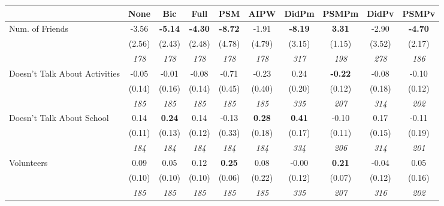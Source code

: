 \begin{tabular}{l c c c c c c c c c}
\toprule
 & None & Bic & Full & PSM & AIPW & DidPm & PSMPm & DidPv & PSMPv \\
\midrule
Num. of Friends & -3.56 & \textbf{ -5.14 } & \textbf{ -4.30 } & \textbf{-8.72} & -1.91 & \textbf{ -8.19 } & \textbf{3.31} & -2.90 & \textbf{-4.70} \\
& (2.56) & (2.43) & (2.48) & (4.78) & (4.79) & (3.15) & (1.15) & (3.52) & (2.17) \\
& \textit{ 178 } & \textit{ 178 } & \textit{ 178 } & \textit{ 178 } & \textit{ 178 } & \textit{ 317 } & \textit{ 198 } & \textit{ 278 } & \textit{ 186 } \\
Doesn't Talk About Activities & -0.05 & -0.01 & -0.08 & -0.71 & -0.23 & 0.24 & \textbf{-0.22} & -0.08 & -0.10 \\
& (0.14) & (0.16) & (0.14) & (0.45) & (0.40) & (0.20) & (0.12) & (0.18) & (0.12) \\
& \textit{ 185 } & \textit{ 185 } & \textit{ 185 } & \textit{ 185 } & \textit{ 185 } & \textit{ 335 } & \textit{ 207 } & \textit{ 314 } & \textit{ 202 } \\
Doesn't Talk About School & 0.14 & \textbf{ 0.24 } & 0.14 & -0.13 & \textbf{0.28} & \textbf{ 0.41 } & -0.10 & 0.17 & -0.11 \\
& (0.11) & (0.13) & (0.12) & (0.33) & (0.18) & (0.17) & (0.11) & (0.15) & (0.19) \\
& \textit{ 184 } & \textit{ 184 } & \textit{ 184 } & \textit{ 184 } & \textit{ 184 } & \textit{ 334 } & \textit{ 206 } & \textit{ 314 } & \textit{ 201 } \\
Volunteers & 0.09 & 0.05 & 0.12 & \textbf{0.25} & 0.08 & -0.00 & \textbf{0.21} & -0.04 & 0.05 \\
& (0.10) & (0.10) & (0.10) & (0.06) & (0.22) & (0.12) & (0.07) & (0.12) & (0.16) \\
& \textit{ 185 } & \textit{ 185 } & \textit{ 185 } & \textit{ 185 } & \textit{ 185 } & \textit{ 335 } & \textit{ 207 } & \textit{ 316 } & \textit{ 202 } \\
\bottomrule
\end{tabular}
